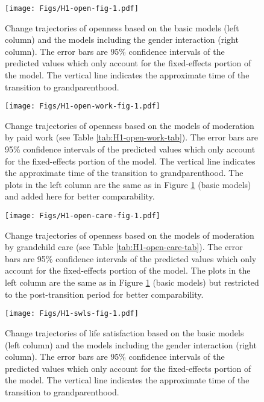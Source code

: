 \documentclass[
  english,
  man, noextraspace]{apa7}
\begin{document}
\begin{appendix}
\begin{figure}
\centering
\texttt{[image: Figs/H1-open-fig-1.pdf]}
\caption{\label{fig:H1-open-fig}Change trajectories of openness based on the basic
models (left column) and the models including the gender interaction
(right column). The error bars are 95\% confidence intervals of the
predicted values which only account for the fixed-effects portion of the
model. The vertical line indicates the approximate time of the
transition to grandparenthood.}
\end{figure}










\begin{figure}
\centering
\texttt{[image: Figs/H1-open-work-fig-1.pdf]}
\caption{\label{fig:H1-open-work-fig}Change trajectories of openness based on the
models of moderation by paid work (see Table
\ref{tab:H1-open-work-tab}). The error bars are 95\% confidence
intervals of the predicted values which only account for the
fixed-effects portion of the model. The vertical line indicates the
approximate time of the transition to grandparenthood. The plots in the
left column are the same as in Figure \ref{fig:H1-open-fig} (basic
models) and added here for better comparability.}
\end{figure}









\begin{figure}
\centering
\texttt{[image: Figs/H1-open-care-fig-1.pdf]}
\caption{\label{fig:H1-open-care-fig}Change trajectories of openness based on the
models of moderation by grandchild care (see Table
\ref{tab:H1-open-care-tab}). The error bars are 95\% confidence
intervals of the predicted values which only account for the
fixed-effects portion of the model. The plots in the left column are the
same as in Figure \ref{fig:H1-open-fig} (basic models) but restricted to
the post-transition period for better comparability.}
\end{figure}








\begin{figure}
\centering
\texttt{[image: Figs/H1-swls-fig-1.pdf]}
\caption{\label{fig:H1-swls-fig}Change trajectories of life satisfaction based on
the basic models (left column) and the models including the gender
interaction (right column). The error bars are 95\% confidence intervals
of the predicted values which only account for the fixed-effects portion
of the model. The vertical line indicates the approximate time of the
transition to grandparenthood.}
\end{figure}











\end{appendix}
\end{document}
